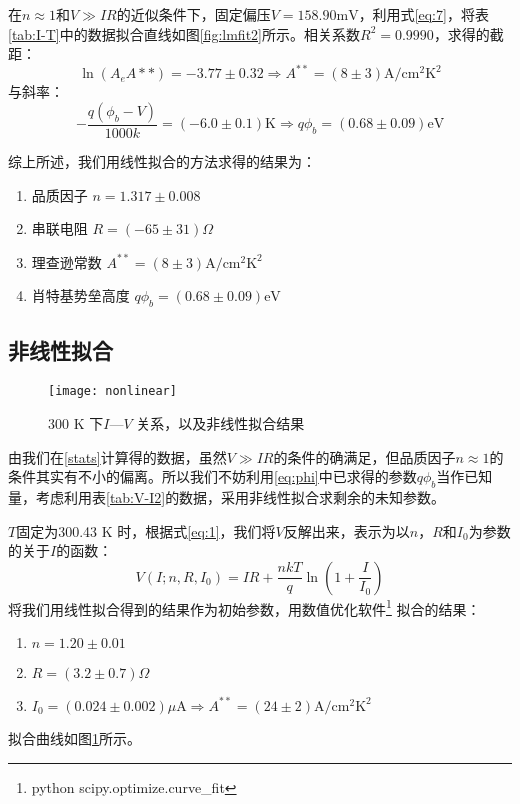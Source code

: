 \documentclass[aps,pre,12pt,preprint,onecolumn,showpacs,showkeys]{revtex4-1}
\begin{document}
        在$n\approx 1$和$V\gg IR$的近似条件下，固定偏压$V=158.90\mathrm {mV}$，利用式\ref{eq:7}，将表\ref{tab:I-T}中的数据拟合直线如图\ref{fig:lmfit2}所示。相关系数$R^2=0.9990$，求得的截距：
        \begin{equation}\label{eq:A}
            \ln (A_e A**)=-3.77\pm 0.32 \Rightarrow A^{**}=(8\pm 3) \mathrm{A/cm^2 K^2}
        \end{equation}
        与斜率：
        \begin{equation}\label{eq:phi}
            -\frac{q(\phi_b -V)}{1000 k}=(-6.0\pm 0.1)\mathrm K \Rightarrow q \phi_b=(0.68 \pm 0.09)\mathrm {eV}
        \end{equation}
        
        综上所述，我们用线性拟合的方法求得的结果为：
        \begin{enumerate}\label{stats}
            \item 品质因子 $n=1.317\pm 0.008$
            \item 串联电阻 $R=(-65\pm 31)\Omega$
            \item 理查逊常数 $A^{**}=(8\pm 3) \mathrm{A/cm^2 K^2}$
            \item 肖特基势垒高度 $q \phi_b=(0.68 \pm 0.09)\mathrm {eV}$
        \end{enumerate}
    \subsection{非线性拟合}
        \begin{figure}[ht]
            \centering
            \texttt{[image: nonlinear]}
            \caption{\label{fig:nonlin}%
            300 K 下$I$—$V$ 关系，以及非线性拟合结果}
        \end{figure}
        由我们在\ref{stats}计算得的数据，虽然$V\gg IR$的条件的确满足，但品质因子$n\approx 1$的条件其实有不小的偏离。所以我们不妨利用\ref{eq:phi}中已求得的参数$q\phi_b$当作已知量，考虑利用表\ref{tab:V-I2}的数据，采用非线性拟合求剩余的未知参数。
        
        $T$固定为300.43 K 时，根据式\ref{eq:1}，我们将$V$反解出来，表示为以$n$，$R$和$I_0$为参数的关于$I$的函数：
        \begin{equation}
            V(I;n,R,I_0)=IR+\frac{nkT}{q}\ln\left(1+\frac{I}{I_0}\right)
        \end{equation}
        将我们用线性拟合得到的结果作为初始参数，用数值优化软件\footnote{%
        python scipy.optimize.curve\_fit}
        拟合的结果：
        \begin{enumerate}
            \item $n=1.20 \pm 0.01$
            \item $R=(3.2 \pm 0.7) \Omega$
            \item $I_0=(0.024\pm 0.002) \mu \mathrm{A} \Rightarrow A^{**}=(24\pm 2)\mathrm{A/cm^2 K^2}$
        \end{enumerate}
        拟合曲线如图\ref{fig:nonlin}所示。
        
\end{document}
